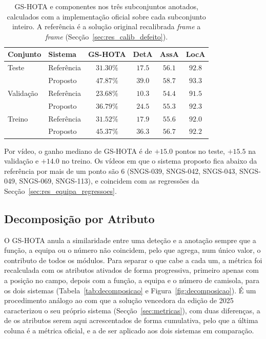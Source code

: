 \begin{table}[htbp]
    \centering
    \caption{GS-HOTA e componentes nos três subconjuntos anotados, calculados com a implementação oficial sobre cada subconjunto inteiro. A referência é a solução original recalibrada \emph{frame} a \emph{frame} (Secção~\ref{sec:res_calib_defeito}).}
    \label{tab:gshota}
    \begin{tabular}{|l|l|c|c|c|c|}
        \hline
        \textbf{Conjunto} & \textbf{Sistema} & \textbf{GS-HOTA} & \textbf{DetA} & \textbf{AssA} & \textbf{LocA} \\
        \hline
        Teste & Referência & $31.30\%$ & $17.5$ & $56.1$ & $92.8$ \\
        \hline
         & Proposto & $47.87\%$ & $39.0$ & $58.7$ & $93.3$ \\
        \hline
        Validação & Referência & $23.68\%$ & $10.3$ & $54.4$ & $91.5$ \\
        \hline
         & Proposto & $36.79\%$ & $24.5$ & $55.3$ & $92.3$ \\
        \hline
        Treino & Referência & $31.52\%$ & $17.9$ & $55.6$ & $92.0$ \\
        \hline
         & Proposto & $45.37\%$ & $36.3$ & $56.7$ & $92.2$ \\
        \hline
    \end{tabular}
\end{table}

Por vídeo, o ganho mediano de GS-HOTA é de $+15.0$ pontos no teste, $+15.5$ na validação e $+14.0$ no treino. Os vídeos em que o sistema proposto fica abaixo da referência por mais de um ponto são 6 (SNGS-039, SNGS-042, SNGS-043, SNGS-049, SNGS-069, SNGS-113), e coincidem com as regressões da Secção~\ref{sec:res_equipa_regressoes}.

\subsection{Decomposição por Atributo}\label{sec:res_decomposicao}

O GS-HOTA anula a similaridade entre uma deteção e a anotação sempre que a função, a equipa ou o número não coincidem, pelo que agrega, num único valor, o contributo de todos os módulos. Para separar o que cabe a cada um, a métrica foi recalculada com os atributos ativados de forma progressiva, primeiro apenas com a posição no campo, depois com a função, a equipa e o número de camisola, para os dois sistemas (Tabela~\ref{tab:decomposicao} e Figura~\ref{fig:decomposicao}). É um procedimento análogo ao com que a solução vencedora da edição de 2025 caracterizou o seu próprio sistema (Secção~\ref{sec:metricas}), com duas diferenças, a de os atributos serem aqui acrescentados de forma cumulativa, pelo que a última coluna é a métrica oficial, e a de ser aplicado aos dois sistemas em comparação.

